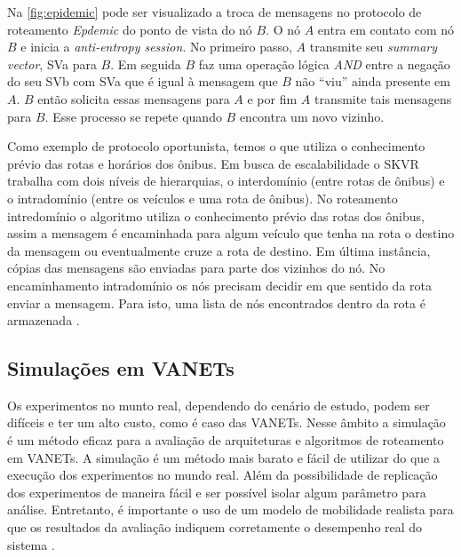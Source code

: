 \documentclass[mestrado, pre-defesa, english, brazil]{packages/icmc}
\begin{document}
Na \autoref{fig:epidemic} pode ser visualizado a troca de mensagens no protocolo de roteamento \textit{Epdemic} do ponto de vista do nó $B$. O nó $A$ entra em contato com nó $B$ e inicia a \textit{anti-entropy session}. No primeiro passo, $A$ transmite seu \textit{summary vector}, SVa para $B$. Em seguida $B$ faz uma operação lógica \textit{AND} entre a negação do seu SVb com SVa que é igual à mensagem que $B$ não ``viu'' ainda presente em $A$. $B$ então solicita essas mensagens para $A$ e por fim $A$ transmite tais mensagens para $B$. Esse processo se repete quando $B$ encontra um novo vizinho.

Como exemplo de protocolo oportunista, temos o  que utiliza o conhecimento prévio das rotas e horários dos ônibus. Em busca de escalabilidade o SKVR trabalha com dois níveis de hierarquias, o interdomínio (entre rotas de ônibus) e o intradomínio (entre os veículos e uma rota de ônibus). No roteamento intredomínio o algoritmo utiliza o conhecimento prévio das rotas dos ônibus, assim a mensagem é encaminhada para algum veículo que tenha na rota o destino da mensagem ou eventualmente cruze a rota de destino. Em última instância, cópias das mensagens são enviadas para parte dos vizinhos do nó. No encaminhamento intradomínio os nós precisam decidir em que sentido da rota enviar a mensagem. Para isto, uma lista de nós encontrados dentro da rota é armazenada \cite{Alves-2009}. 


\subsection{Simulações em VANETs} \label{exp_vanets}


Os experimentos no munto real, dependendo do cenário de estudo, podem ser difíceis e ter um alto custo, como é caso das VANETs. Nesse âmbito a simulação é um método eficaz para a avaliação de arquiteturas e algoritmos de roteamento em VANETs. A simulação é um método mais barato e fácil de utilizar do que a execução dos experimentos no mundo real. Além da possibilidade de replicação dos experimentos de maneira fácil e ser possível isolar algum parâmetro para análise. Entretanto, é importante o uso de um modelo de mobilidade realista para que os resultados da avaliação indiquem corretamente o desempenho real do sistema \cite{Saha-2004,Mahajan-2006}.
\end{document}
